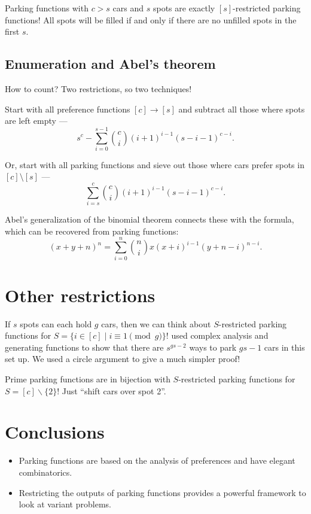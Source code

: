 \documentclass[thesis]{hmcposter}
\begin{document}
\begin{poster}
Parking functions with $c > s$ cars and $s$ spots are exactly $[s]$-restricted parking functions! All spots will be filled if and only if there are no unfilled spots in the first $s$.

\subsection{Enumeration and Abel's theorem}

How to count? Two restrictions, so two techniques! 

Start with all preference functions $[c] \to [s]$ and subtract all those where spots are left empty ---
\[
	s^{c} - \sum_{i = 0}^{s - 1} \binom{c}{i} (i + 1)^{i - 1} (s - i - 1)^{c - i}.
\]

Or, start with all parking functions and sieve out those where cars prefer spots in $[c] \setminus [s]$ ---
\[
	\sum_{i = s}^{c} \binom{c}{i} (i + 1)^{i - 1} (s - i - 1)^{c - i}.
\]

Abel's generalization of the binomial theorem connects these with the formula, which can be recovered from parking functions:
\[
	(x + y + n)^{n} = \sum_{i = 0}^{n} \binom{n}{i} x (x + i)^{i - 1} (y + n - i)^{n - i}.
\]

\newcolumn 
\section{Other restrictions}

If $s$ spots can each hold $g$ cars, then we can think about $S$-restricted parking functions for $S = \{ i \in [c] \mid i \equiv 1 \pmod g \}$! \cite{blake-konheim-1977} used complex analysis and generating functions to show that there are $s^{gs - 2}$ ways to park $gs - 1$ cars in this set up. We used a circle argument to give a much simpler proof!

Prime parking functions are in bijection with $S$-restricted parking functions for $S = [c]\backslash\{2\}$! Just ``shift cars over spot 2''.

\section{Conclusions}

\begin{itemize}
    \item Parking functions are based on the analysis of preferences and have elegant combinatorics.
    \item Restricting the outputs of parking functions provides a powerful framework to look at variant problems.
\end{itemize}


\end{poster}
\end{document}
